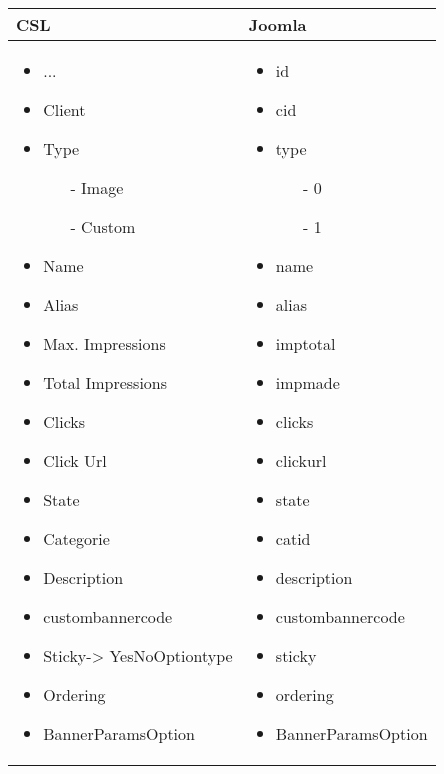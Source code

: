 \begin{minipage}{0.7\textwidth}
\begin{tabular}{|p{} | p{}|}
\hline
\textbf{CSL} & \textbf{Joomla} \\ 
\hline
\begin{itemize}
\item  ...
\item  Client
\item  Type
	\begin{enumerate}
      \item[-] Image
	  \item[-] Custom
	\end{enumerate}
\item  Name
\item  Alias
\item  Max. Impressions
\item  Total Impressions
\item  Clicks
\item  Click Url
\item  State
\item  Categorie
\item  Description
\item  custombannercode
\item  Sticky-> YesNoOptiontype
\item  Ordering
\item  BannerParamsOption
\end{itemize}
 & 
\begin{itemize}
\item  id
\item  cid
\item  type
	\begin{enumerate}
      \item[-] 0
	  \item[-] 1
	\end{enumerate}
\item  name
\item  alias
\item  imptotal
\item  impmade
\item  clicks
\item  clickurl
\item  state
\item  catid
\item  description
\item  custombannercode
\item  sticky
\item  ordering
\item  BannerParamsOption

\end{itemize}
\\
\hline
\end{tabular}
\end{minipage}

